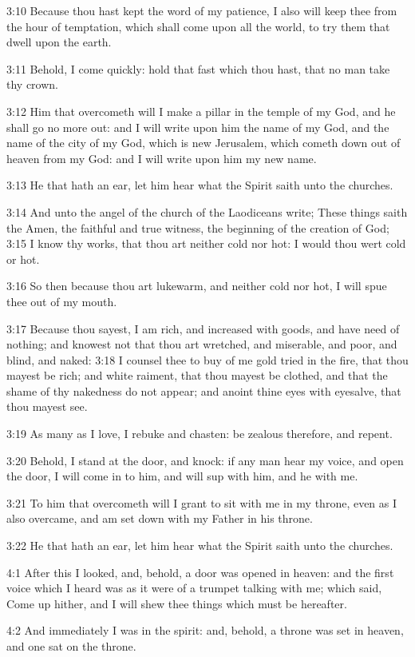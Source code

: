 3:10 Because thou hast kept the word of my patience, I also will keep thee from the hour of temptation, which shall come upon all the world, to try them that dwell upon the earth.

3:11 Behold, I come quickly: hold that fast which thou hast, that no man take thy crown.

3:12 Him that overcometh will I make a pillar in the temple of my God, and he shall go no more out: and I will write upon him the name of my God, and the name of the city of my God, which is new Jerusalem, which cometh down out of heaven from my God: and I will write upon him my new name.

3:13 He that hath an ear, let him hear what the Spirit saith unto the churches.

3:14 And unto the angel of the church of the Laodiceans write; These things saith the Amen, the faithful and true witness, the beginning of the creation of God; 3:15 I know thy works, that thou art neither cold nor hot: I would thou wert cold or hot.

3:16 So then because thou art lukewarm, and neither cold nor hot, I will spue thee out of my mouth.

3:17 Because thou sayest, I am rich, and increased with goods, and have need of nothing; and knowest not that thou art wretched, and miserable, and poor, and blind, and naked: 3:18 I counsel thee to buy of me gold tried in the fire, that thou mayest be rich; and white raiment, that thou mayest be clothed, and that the shame of thy nakedness do not appear; and anoint thine eyes with eyesalve, that thou mayest see.

3:19 As many as I love, I rebuke and chasten: be zealous therefore, and repent.

3:20 Behold, I stand at the door, and knock: if any man hear my voice, and open the door, I will come in to him, and will sup with him, and he with me.

3:21 To him that overcometh will I grant to sit with me in my throne, even as I also overcame, and am set down with my Father in his throne.

3:22 He that hath an ear, let him hear what the Spirit saith unto the churches.

4:1 After this I looked, and, behold, a door was opened in heaven: and the first voice which I heard was as it were of a trumpet talking with me; which said, Come up hither, and I will shew thee things which must be hereafter.

4:2 And immediately I was in the spirit: and, behold, a throne was set in heaven, and one sat on the throne.

